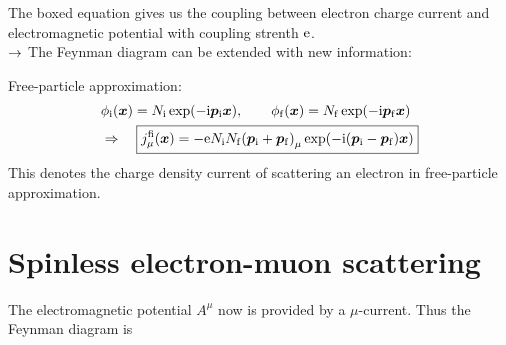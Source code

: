 The boxed equation gives us the coupling between electron charge current and electromagnetic potential with coupling strenth $\mathrm{e}$.\\
$\rightarrow$ The Feynman diagram can be extended with new information:
\begin{center}
\end{center}
Free-particle approximation:
\begin{align}\begin{split}
    & \phi_{\mathrm{i}}\qty({\bm{x}}) = N_{\mathrm{i}} \exp(- \mathrm{i} {\bm{p}}_{\mathrm{i}} {\bm{x}}), \qquad \phi_{\mathrm{f}} \qty({\bm{x}}) = N_{\mathrm{f}} \exp(- \mathrm{i} {\bm{p}}_{\mathrm{f}} {\bm{x}}) \\
    & \Rightarrow \quad \boxed{ j_\mu^{\mathrm{fi}} \qty({\bm{x}}) = - \mathrm{e} N_{\mathrm{i}} N_{\mathrm{f}} \qty({\bm{p}}_{\mathrm{i}} + {\bm{p}}_{\mathrm{f}})_\mu \exp(-\mathrm{i} \qty({\bm{p}}_{\mathrm{i}} - {\bm{p}}_{\mathrm{f}}) {\bm{x}}) }
\end{split}\end{align}
This denotes the charge density current of scattering an electron in free-particle  approximation.

\pagebreak
\section{Spinless electron-muon scattering}
The electromagnetic potential $A^\mu$ now is provided by a $\mu$-current. Thus the Feynman diagram is

